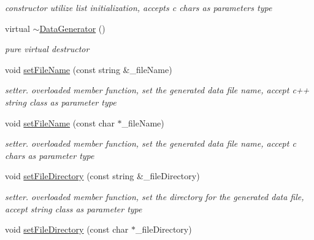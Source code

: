 \begin{DoxyCompactItemize}
\begin{DoxyCompactList}\small\item\em constructor utilize list initialization, accepts c chars as parameters type \end{DoxyCompactList}\item 
\hypertarget{classDataGenerator_aa0efe82e850a32a8dc18fcbe99da6bf4}{virtual \hyperlink{classDataGenerator_aa0efe82e850a32a8dc18fcbe99da6bf4}{$\sim$\-Data\-Generator} ()}\label{classDataGenerator_aa0efe82e850a32a8dc18fcbe99da6bf4}

\begin{DoxyCompactList}\small\item\em pure virtual destructor \end{DoxyCompactList}\item 
\hypertarget{classDataGenerator_adb362b34246ae1567b304a970e1c84f8}{void \hyperlink{classDataGenerator_adb362b34246ae1567b304a970e1c84f8}{set\-File\-Name} (const string \&\-\_\-file\-Name)}\label{classDataGenerator_adb362b34246ae1567b304a970e1c84f8}

\begin{DoxyCompactList}\small\item\em setter. overloaded member function, set the generated data file name, accept c++ string class as parameter type \end{DoxyCompactList}\item 
\hypertarget{classDataGenerator_a3b36d96241705dd8c625c9a629ad7b3e}{void \hyperlink{classDataGenerator_a3b36d96241705dd8c625c9a629ad7b3e}{set\-File\-Name} (const char $\ast$\-\_\-file\-Name)}\label{classDataGenerator_a3b36d96241705dd8c625c9a629ad7b3e}

\begin{DoxyCompactList}\small\item\em setter. overloaded member function, set the generated data file name, accept c chars as parameter type \end{DoxyCompactList}\item 
\hypertarget{classDataGenerator_a08252e83067f3f635dafc43ef44a5d40}{void \hyperlink{classDataGenerator_a08252e83067f3f635dafc43ef44a5d40}{set\-File\-Directory} (const string \&\-\_\-file\-Directory)}\label{classDataGenerator_a08252e83067f3f635dafc43ef44a5d40}

\begin{DoxyCompactList}\small\item\em setter. overloaded member function, set the directory for the generated data file, accept string class as parameter type \end{DoxyCompactList}\item 
\hypertarget{classDataGenerator_a4a62575e04f21f18aad89327dffd6b6d}{void \hyperlink{classDataGenerator_a4a62575e04f21f18aad89327dffd6b6d}{set\-File\-Directory} (const char $\ast$\-\_\-file\-Directory)}\label{classDataGenerator_a4a62575e04f21f18aad89327dffd6b6d}


\end{DoxyCompactItemize}
